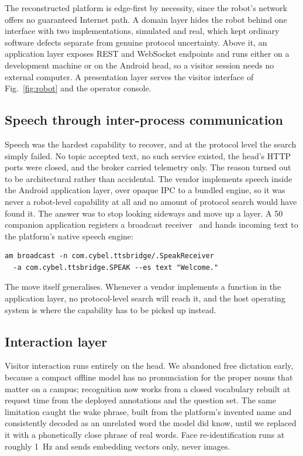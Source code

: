 The reconstructed platform is edge-first by necessity, since the robot's network offers no
guaranteed Internet path. A domain layer hides the robot behind one interface with two
implementations, simulated and real, which kept ordinary software defects separate from genuine
protocol uncertainty. Above it, an application layer exposes REST and WebSocket endpoints and
runs either on a development machine or on the Android head, so a visitor session needs no
external computer. A presentation layer serves the visitor interface of Fig.~\ref{fig:robot} and
the operator console.

\subsection{Speech through inter-process communication}

Speech was the hardest capability to recover, and at the protocol level the search simply
failed. No topic accepted text, no such service existed, the head's HTTP ports were closed, and
the broker carried telemetry only. The reason turned out to be architectural rather than
accidental. The vendor implements speech inside the Android application layer, over opaque IPC
to a bundled engine, so it was never a robot-level capability at all and no amount of protocol
search would have found it. The answer was to stop looking sideways and move up a layer. A
\SI{50}{\kilo\byte} companion application registers a broadcast
receiver~\cite{chin2011android} and hands incoming text to the platform's native speech engine:

\begin{footnotesize}
\begin{verbatim}
am broadcast -n com.cybel.ttsbridge/.SpeakReceiver
  -a com.cybel.ttsbridge.SPEAK --es text "Welcome."
\end{verbatim}
\end{footnotesize}

\noindent The move itself generalises. Whenever a vendor implements a function in the
application layer, no protocol-level search will reach it, and the host operating system is
where the capability has to be picked up instead.

\subsection{Interaction layer}

Visitor interaction runs entirely on the head. We abandoned free dictation early, because a
compact offline model has no pronunciation for the proper nouns that matter on a campus;
recognition now works from a closed vocabulary rebuilt at request time from the deployed
annotations and the question set. The same limitation caught the wake phrase, built from the
platform's invented name and consistently decoded as an unrelated word the model did know, until
we replaced it with a phonetically close phrase of real words. Face re-identification runs at
roughly \SI{1}{\hertz} and sends embedding vectors only, never images.
